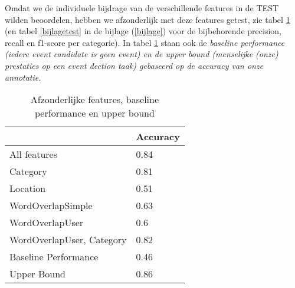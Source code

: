 {{Omdat we de individuele bijdrage van de verschillende features in de TEST wilden beoordelen, hebben we afzonderlijk met deze features getest,
zie tabel \ref{testfeatures} (en tabel \ref{bijlagetest} in de bijlage (\ref{bijlage}) voor de bijbehorende precision, recall en f1-score per
categorie). In tabel \ref{testfeatures} staan ook de \it{baseline performance} (iedere event candidate is geen event) en de \it{upper bound} (menselijke
(onze) prestaties op een event dection taak) gebaseerd op de accuracy van onze annotatie.

\begin{table}[H]
\centering
\caption{Afzonderlijke features, baseline performance en upper bound}\label{testfeatures}
\vspace*{-5pt}
\begin{tabular}{|l|l|}
\hline
                          & Accuracy \\ \hline
All features              & 0.84     \\ \hline
Category                  & 0.81     \\ \hline
Location                  & 0.51     \\ \hline
WordOverlapSimple         & 0.63     \\ \hline
WordOverlapUser           & 0.6      \\ \hline
WordOverlapUser, Category & 0.82     \\ \hline
Baseline Performance      & 0.46     \\ \hline
Upper Bound               & 0.86     \\ \hline
\end{tabular}
\end{table}

}}
